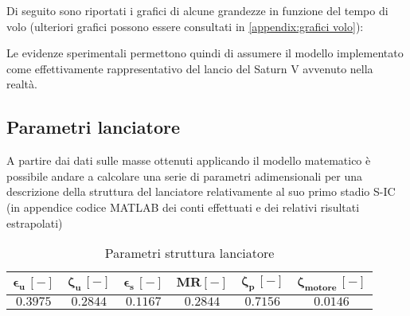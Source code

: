 Di seguito sono riportati i grafici di alcune grandezze in funzione del tempo di volo (ulteriori grafici possono essere consultati in \autoref{appendix:grafici volo}):



Le evidenze sperimentali permettono quindi di assumere il modello implementato come effettivamente rappresentativo del lancio del Saturn V avvenuto nella realtà.

\subsection{Parametri lanciatore}
\label{subsec:parametri primo stadio}
A partire dai dati sulle masse ottenuti applicando il modello matematico è possibile andare a calcolare una serie di parametri adimensionali per una descrizione della struttura del lanciatore relativamente al suo primo stadio S-IC (in appendice codice MATLAB dei conti effettuati e dei relativi risultati estrapolati)

\begin{table}[H]
\centering
\begin{tabular}{|c|c|c|c|c|c|}
\hline
$\bm{\epsilon_u \, [-]}$ & $\bm{\zeta_u \, [-]}$ & $\bm{\epsilon_s \, [-]}$ & $\bm{MR [-]}$ & $\bm{\zeta_p \, [-]}$ & $\bm{\zeta_{motore} \, [-]}$ \\
\hline
$0.3975$ & $0.2844$ & $0.1167$ &  $0.2844$ & $0.7156$ & $0.0146$ \\
\hline
\end{tabular}

\caption{Parametri struttura lanciatore}
\label{table: structural performance data}
\end{table}
